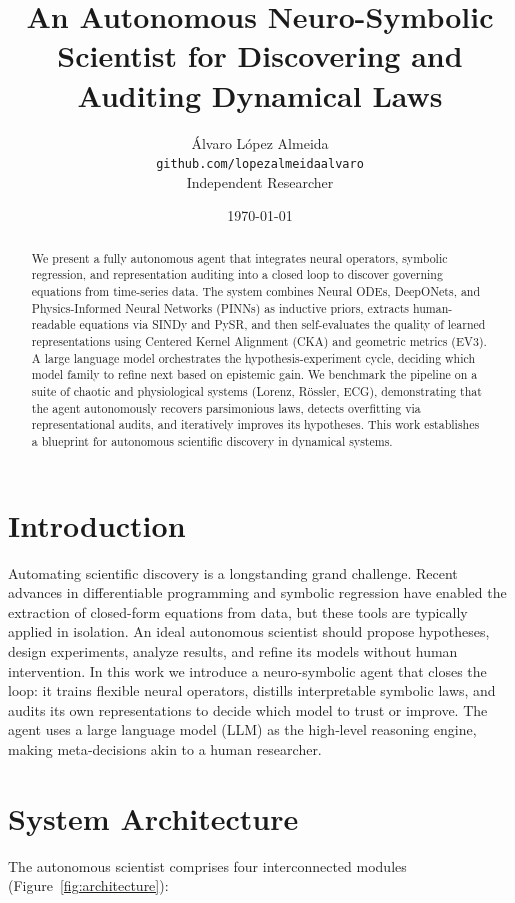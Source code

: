 \documentclass{article}
\title{An Autonomous Neuro-Symbolic Scientist for Discovering and Auditing Dynamical Laws}
\author{Álvaro López Almeida \\
\small \texttt{github.com/lopezalmeidaalvaro} \\
\small Independent Researcher}
\date{\today}
\begin{document}
\maketitle

\begin{abstract}
We present a fully autonomous agent that integrates neural operators, symbolic regression, and representation auditing into a closed loop to discover governing equations from time-series data. The system combines Neural ODEs, DeepONets, and Physics-Informed Neural Networks (PINNs) as inductive priors, extracts human-readable equations via SINDy and PySR, and then self-evaluates the quality of learned representations using Centered Kernel Alignment (CKA) and geometric metrics (EV3). A large language model orchestrates the hypothesis-experiment cycle, deciding which model family to refine next based on epistemic gain. We benchmark the pipeline on a suite of chaotic and physiological systems (Lorenz, Rössler, ECG), demonstrating that the agent autonomously recovers parsimonious laws, detects overfitting via representational audits, and iteratively improves its hypotheses. This work establishes a blueprint for autonomous scientific discovery in dynamical systems.
\end{abstract}

\section{Introduction}
\label{sec:intro}
Automating scientific discovery is a longstanding grand challenge. Recent advances in differentiable programming and symbolic regression have enabled the extraction of closed-form equations from data, but these tools are typically applied in isolation. An ideal autonomous scientist should propose hypotheses, design experiments, analyze results, and refine its models without human intervention. In this work we introduce a neuro-symbolic agent that closes the loop: it trains flexible neural operators, distills interpretable symbolic laws, and audits its own representations to decide which model to trust or improve. The agent uses a large language model (LLM) as the high‑level reasoning engine, making meta‑decisions akin to a human researcher.

\section{System Architecture}
\label{sec:arch}
The autonomous scientist comprises four interconnected modules (Figure~\ref{fig:architecture}):
\end{document}
